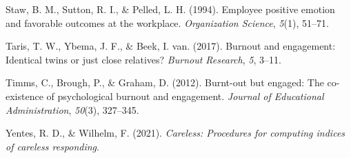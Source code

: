 \documentclass[
  man]{apa6}
\newlength{\cslhangindent}
\newlength{\cslentryspacingunit} %
\newenvironment{CSLReferences}[2] %
 {%
  \setlength{\parindent}{0pt}
  \ifodd #1
  \let\oldpar\par
  \def\par{\hangindent=\cslhangindent\oldpar}
  \fi
  \setlength{\parskip}{#2\cslentryspacingunit}
 }%
 {}
\begin{document}
\begin{CSLReferences}{1}{0}
\leavevmode{}%
Staw, B. M., Sutton, R. I., \& Pelled, L. H. (1994). Employee positive emotion and favorable outcomes at the workplace. \emph{Organization Science}, \emph{5}(1), 51--71.

\leavevmode{}%
Taris, T. W., Ybema, J. F., \& Beek, I. van. (2017). Burnout and engagement: Identical twins or just close relatives? \emph{Burnout Research}, \emph{5}, 3--11.

\leavevmode{}%
Timms, C., Brough, P., \& Graham, D. (2012). Burnt-out but engaged: The co-existence of psychological burnout and engagement. \emph{Journal of Educational Administration}, \emph{50}(3), 327--345.

\leavevmode{}%
Yentes, R. D., \& Wilhelm, F. (2021). \emph{Careless: Procedures for computing indices of careless responding}.

\end{CSLReferences}
\end{document}
